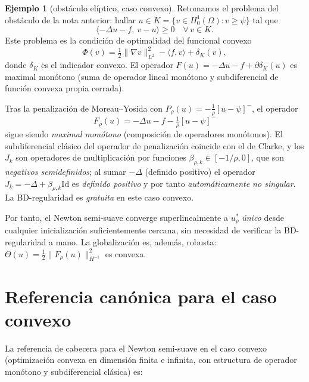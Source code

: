 \documentclass[12pt]{book}
\newcommand{\indic}{\delta}
\newcommand{\Id}{\mathrm{Id}}
\newcommand{\subdiffR}{\partial}
\theoremstyle{definition}
\newtheorem{ejemplo}{Ejemplo}[section]
\theoremstyle{plain}
\theoremstyle{remark}
\begin{document}
\begin{ejemplo}[obstáculo elíptico, caso convexo]
  Retomamos el problema del obstáculo de la nota anterior:
  hallar $u\in K=\{v\in H^1_0(\Omega):v\ge\psi\}$ tal que
  \[
    \langle -\Delta u-f,\ v-u\rangle\ge0\quad\forall\,v\in K.
  \]
  Este problema es la condición de optimalidad del funcional
  convexo
  \[
    \Phi(v)=\tfrac12\|\nabla v\|_{L^2}^2-\langle f,v\rangle+\indic_K(v),
  \]
  donde $\indic_K$ es el indicador convexo.  El operador
  $F(u)=-\Delta u-f+\subdiffR\indic_K(u)$ es maximal monótono
  (suma de operador lineal monótono y subdiferencial de función
  convexa propia cerrada).

  \medskip
  Tras la penalización de Moreau--Yosida con
  $P_\rho(u)=-\tfrac1\rho[u-\psi]^-$, el operador
  \[
    F_\rho(u)=-\Delta u-f-\tfrac1\rho[u-\psi]^-
  \]
  sigue siendo \emph{maximal monótono} (composición de operadores
  monótonos).  El subdiferencial clásico del operador de
  penalización coincide con el de Clarke, y los $J_k$ son
  operadores de multiplicación por funciones
  $\beta_{\rho,k}\in[-1/\rho,0]$, que son \emph{negativos
  semidefinidos}; al sumar $-\Delta$ (definido positivo) el
  operador $J_k=-\Delta+\beta_{\rho,k}\Id$ es \emph{definido
  positivo} y por tanto \emph{automáticamente no singular}.  La
  BD-regularidad es \emph{gratuita} en este caso convexo.

  \medskip
  Por tanto, el Newton semi-suave converge superlinealmente a
  $u^*_\rho$ \emph{único} desde cualquier inicialización
  suficientemente cercana, sin necesidad de verificar la
  BD-regularidad a mano.  La globalización es, además, robusta:
  $\Theta(u)=\tfrac12\|F_\rho(u)\|_{H^{-1}}^2$ es convexa.
\end{ejemplo}

\section{Referencia canónica para el caso convexo}

La referencia de cabecera para el Newton semi-suave en el caso convexo
(optimización convexa en dimensión finita e infinita, con estructura
de operador monótono y subdiferencial clásica) es:

\begin{center}
\end{center}
\end{document}
